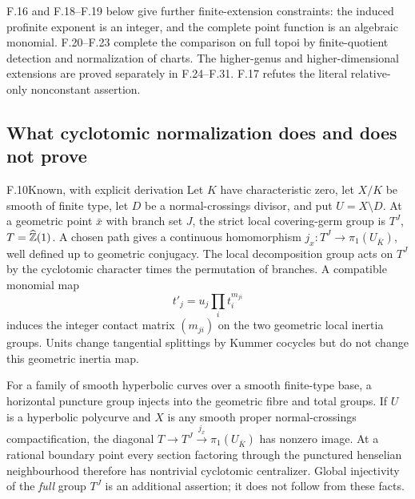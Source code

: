 F.16 and F.18--F.19 below give further finite-extension constraints:
the induced profinite exponent is an integer, and the complete point
function is an algebraic monomial. F.20--F.23 complete the comparison
on full topoi by finite-quotient detection and normalization of
charts. The higher-genus and higher-dimensional extensions
are proved separately in F.24--F.31. F.17 refutes the literal
relative-only nonconstant assertion.

\subsection{What cyclotomic normalization does and does not prove}

\begin{claim}{F.10}{Known, with explicit derivation}
Let $K$ have characteristic zero, let $X/K$ be smooth of finite type,
let $D$ be a normal-crossings divisor, and put $U=X\setminus D$.
At a geometric point $\bar x$ with branch set $J$, the strict local
covering-germ group is $T^J$, $T=\widehat{\mathbb Z}(1)$. A chosen path
gives a continuous homomorphism
$j_x:T^J\to\pi_1(U_{\bar K})$, well defined up to geometric
conjugacy. The local decomposition group acts on $T^J$ by the
cyclotomic character times the permutation of branches. A compatible
monomial map
\[
 t'_j=u_j\prod_i t_i^{m_{ji}}
\]
induces the integer contact matrix $(m_{ji})$ on the two geometric
local inertia groups. Units change tangential splittings by Kummer
cocycles but do not change this geometric inertia map.

For a family of smooth hyperbolic curves over a smooth finite-type
base, a horizontal puncture group injects into the geometric fibre
and total groups. If $U$ is a hyperbolic polycurve and $X$ is any
smooth proper normal-crossings compactification, the diagonal
$T\to T^J\xrightarrow{j_x}\pi_1(U_{\bar K})$ has nonzero
image. At a rational boundary point every section factoring through
the punctured henselian neighbourhood therefore has nontrivial
cyclotomic centralizer. Global injectivity of the \emph{full} group
$T^J$ is an additional assertion; it does not follow from these facts.
\end{claim}
